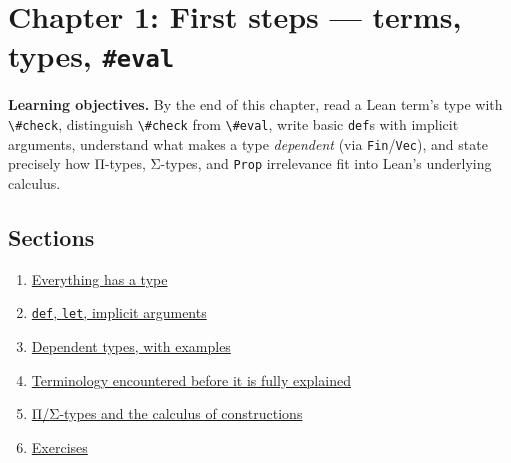 \chapter{\texorpdfstring{Chapter 1: First steps --- terms, types, \texttt{\#eval}}{Chapter 1: First steps --- terms, types, \#eval}}\label{sec:01-basics:00-index:1}

\textbf{Learning objectives.} By the end of this chapter, read a Lean term's type with \texttt{\textbackslash{}\#check}, distinguish \texttt{\textbackslash{}\#check} from \texttt{\textbackslash{}\#eval}, write basic \texttt{def}s with implicit arguments, understand what makes a type \emph{dependent} (via \texttt{Fin}/\texttt{Vec}), and state precisely how Π-types, Σ-types, and \texttt{Prop} irrelevance fit into Lean's underlying calculus.

\section{Sections}\label{sec:01-basics:00-index:2}

\begin{enumerate}
\def\labelenumi{\arabic{enumi}.}
\tightlist
\item
  \hyperref[sec:01-basics:01-everything-has-a-type:1]{Everything has a type}
\item
  \hyperref[sec:01-basics:02-def-let-implicit:1]{\texttt{def}, \texttt{let}, implicit arguments}
\item
  \hyperref[sec:01-basics:03-dependent-types:1]{Dependent types, with examples}
\item
  \hyperref[sec:01-basics:04-terminology:1]{Terminology encountered before it is fully explained}
\item
  \hyperref[sec:01-basics:05-pi-sigma-and-coc:1]{Π/Σ-types and the calculus of constructions}
\item
  \hyperref[sec:01-basics:06-exercises:1]{Exercises}
\end{enumerate}







